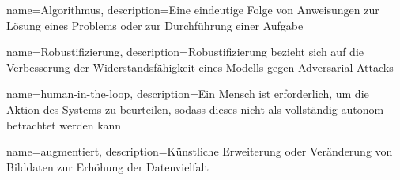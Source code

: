 {}

{
        name=Algorithmus,
        description={Eine eindeutige Folge von Anweisungen zur Lösung eines Problems oder zur Durchführung einer Aufgabe}
}

{
        name=Robustifizierung,
        description={Robustifizierung bezieht sich auf die Verbesserung der Widerstandsfähigkeit eines Modells gegen Adversarial Attacks}
}

{
        name=human-in-the-loop,
        description={Ein Mensch ist erforderlich, um die Aktion des Systems zu beurteilen, sodass dieses nicht als vollständig autonom betrachtet werden kann}
}

{
        name=augmentiert,
        description={Künstliche Erweiterung oder Veränderung von Bilddaten zur Erhöhung der Datenvielfalt}
}

{}













\printglossaries